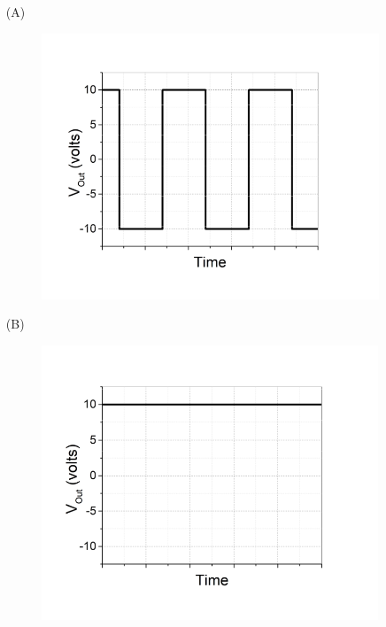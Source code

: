 \documentclass[journal,12pt,twocolumn]{IEEEtran}
\theoremstyle{remark}
\begin{document}
\begin{enumerate}
  \item[(A)]
  \setcounter{figure}{0}
    \begin{figure}[h]
        \centering
        \includegraphics[width=0.8\linewidth]{figs/1.png}
        \label{fig:ann_label}
    \end{figure}
    
  \item[(B)]
  \setcounter{figure}{1}
    \begin{figure}[h]
        \centering
        \includegraphics[width=0.8\linewidth]{figs/2.png}
        \label{fig:sww_label}
    \end{figure}
    

\end{enumerate}
\end{document}
